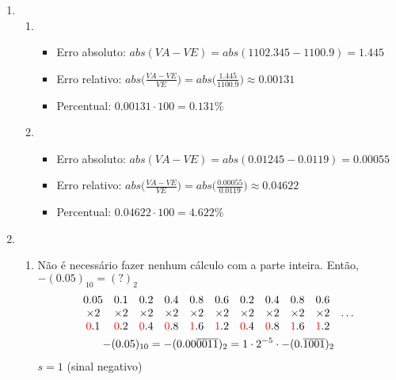 \documentclass{article}
\newcommand\redn[1]{\textcolor{red}{#1}}
\newenvironment{arabenum}{
    \begin{enumerate}[label=\textbf{\arabic*})]
}{
    \end{enumerate}
}
\newenvironment{alphenum}{
    \begin{enumerate}[label=(\alph*)]
}{
    \end{enumerate}
}
\begin{document}
\begin{arabenum}
\item \begin{alphenum}

\item \begin{itemize}

\item Erro absoluto: $abs(VA - VE) = abs(1102.345 - 1100.9)
= \boldsymbol{1.445}$

\item Erro relativo: $abs\big(\frac{VA - VE}{VE}\big)
= abs\big(\frac{1.445}{1100.9}\big) \approx \boldsymbol{0.00131}$

\item Percentual: $0.00131 \cdot 100 = \boldsymbol{0.131\%}$

\end{itemize}

\item \begin{itemize}

\item Erro absoluto: $abs(VA - VE) = abs(0.01245 - 0.0119)
= \boldsymbol{0.00055}$

\item Erro relativo: $abs\big(\frac{VA - VE}{VE}\big)
= abs\big(\frac{0.00055}{0.0119}\big) \approx \boldsymbol{0.04622}$

\item Percentual: $0.04622 \cdot 100 = \boldsymbol{4.622\%}$

\end{itemize}

\end{alphenum}

\item \begin{alphenum}

\item Não é necessário fazer nenhum cálculo com a parte inteira. Então,
$-(0.05)_{10} = (?)_2$
\begin{gather*}
\begin{array}{*{11}c}
0.05 & 0.1 & 0.2 & 0.4 & 0.8 & 0.6 & 0.2 & 0.4 & 0.8 & 0.6 & \\
\times 2 & \times 2 & \times 2 & \times 2 & \times 2 & \times 2 & \times 2 &
\times 2 & \times 2 & \times 2 & \dots \\
\redn{0}.1 & \redn{0}.2 & \redn{0}.4 & \redn{0}.8 & \redn{1}.6 & \redn{1}.2 &
\redn{0}.4 & \redn{0}.8 & \redn{1}.6 & \redn{1}.2 &
\end{array} \\
-(0.05)_{10} = -(0.00\overline{0011})_2 =
1 \cdot 2^{-5} \cdot -(0.\overline{1001})_2
\end{gather*}
$s = 1$ (sinal negativo)


\end{alphenum}
\end{arabenum}
\end{document}
